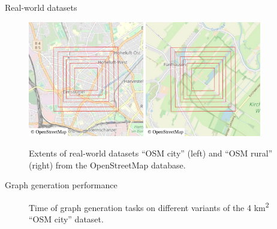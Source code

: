 \documentclass[xcolor={x11names}]{beamer}
\newenvironment{figcenter}
{%
	\parskip=0pt%
	\par%
	\nopagebreak%
	\centering%
}%
{%
	\par%
	\noindent%
	\ignorespacesafterend%
}
\begin{document}
		\begin{frame}{Real-world datasets}
			\begin{figure}
				\begin{figcenter}
					\includegraphics[width=0.45\textwidth]{images/qgis-overview-city.pdf}
					\hspace{0.5cm}
					\includegraphics[width=0.45\textwidth]{images/qgis-overview-rural.pdf}
				\end{figcenter}
				\caption{Extents of real-world datasets \enquote{OSM city} (left) and \enquote{OSM rural} (right) from the OpenStreetMap database.}
			\end{figure}
		\end{frame}
		
		\begin{frame}{Graph generation performance}
			\begin{figure}
				\begin{figcenter}
					\hspace*{-0.35cm}
					\scalebox{0.7}
					{
						
					}
				\end{figcenter}
				\caption{Time of graph generation tasks on different variants of the 4 km\textsuperscript{2} \enquote{OSM city} dataset.}
			\end{figure}
		\end{frame}
		
\end{document}
